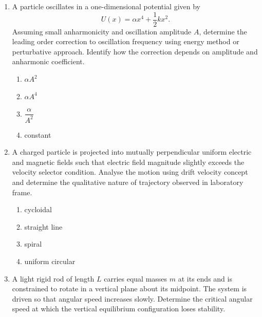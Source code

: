 \documentclass[12pt]{article}
\begin{document}
\begin{enumerate}
\begin{enumerate}[label=\Alph*)]
\item $\dfrac{dR}{dt}\propto R$
\item $\dfrac{dR}{dt}\propto \dfrac{1}{R}$
\item $\dfrac{dR}{dt}\propto \dfrac{1}{R^2}$
\item constant
\end{enumerate}


\item
A particle oscillates in a one-dimensional potential given by  
\[
U(x)=\alpha x^4+\frac{1}{2}kx^2.
\]
Assuming small anharmonicity and oscillation amplitude $A$, determine the leading order correction to oscillation frequency using energy method or perturbative approach. Identify how the correction depends on amplitude and anharmonic coefficient.

\begin{enumerate}[label=\Alph*)]
\item $\alpha A^2$
\item $\alpha A^4$
\item $\dfrac{\alpha}{A^2}$
\item constant
\end{enumerate}


\item
A charged particle is projected into mutually perpendicular uniform electric and magnetic fields such that electric field magnitude slightly exceeds the velocity selector condition. Analyse the motion using drift velocity concept and determine the qualitative nature of trajectory observed in laboratory frame.

\begin{enumerate}[label=\Alph*)]
\item cycloidal
\item straight line
\item spiral
\item uniform circular
\end{enumerate}



\item
A light rigid rod of length $L$ carries equal masses $m$ at its ends and is constrained to rotate in a vertical plane about its midpoint. The system is driven so that angular speed increases slowly. Determine the critical angular speed at which the vertical equilibrium configuration loses stability.


\end{enumerate}
\end{document}
